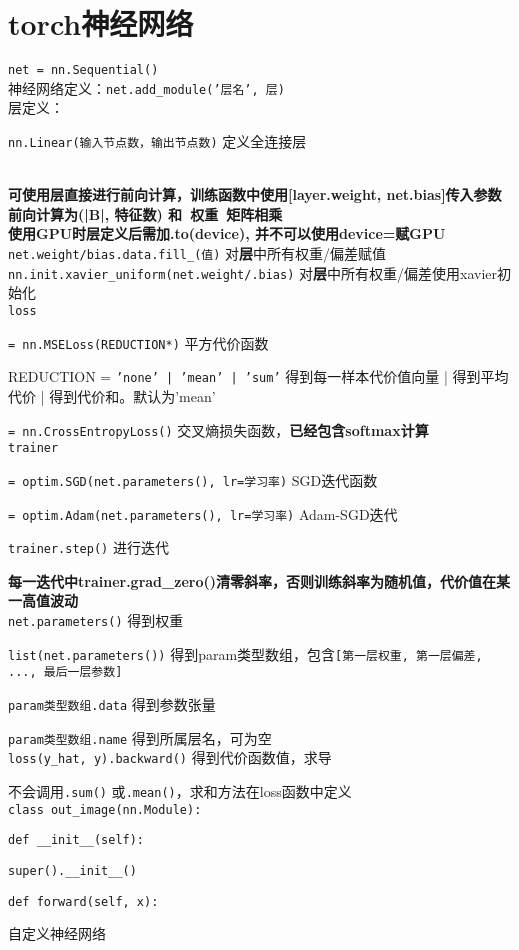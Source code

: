 \documentclass[UTF8]{ctexart}
\begin{document}
\section{torch神经网络}
\noindent \texttt{net = nn.Sequential()}\\
神经网络定义：\texttt{net.add\_module('层名', 层)}\\
层定义：

  \texttt{nn.Linear(输入节点数，输出节点数)} 定义全连接层

  \texttt{}\\
\textbf{可使用层直接进行前向计算，训练函数中使用[layer.weight, net.bias]传入参数}\\
\textbf{前向计算为(|B|, 特征数) 和\ 权重\ 矩阵相乘}\\
\textbf{使用GPU时层定义后需加.to(device), 并不可以使用device=赋GPU}\\
\texttt{net.weight/bias.data.fill\_(值)} 对\textbf{层}中所有权重/偏差赋值\\
\texttt{nn.init.xavier\_uniform(net.weight/.bias)} 对\textbf{层}中所有权重/偏差使用xavier初始化\\
\texttt{loss}

  \texttt{= nn.MSELoss(REDUCTION*)} 平方代价函数

  \quad REDUCTION = \texttt{'none' | 'mean' | 'sum'} 得到每一样本代价值向量 | 得到平均代价 | 得到代价和。默认为'mean'

  \texttt{= nn.CrossEntropyLoss()} 交叉熵损失函数，\textbf{已经包含softmax计算}\\
\texttt{trainer}

  \texttt{= optim.SGD(net.parameters(), lr=学习率)} SGD迭代函数

  \texttt{= optim.Adam(net.parameters(), lr=学习率)} Adam-SGD迭代

  \texttt{trainer.step()} 进行迭代
  
  \textbf{每一迭代中trainer.grad\_zero()清零斜率，否则训练斜率为随机值，代价值在某一高值波动}\\
\texttt{net.parameters()} 得到权重

  \texttt{list(net.parameters())} 得到param类型数组，包含\texttt{[第一层权重, 第一层偏差, ..., 最后一层参数]}
  
  \texttt{param类型数组.data} 得到参数张量
  
  \texttt{param类型数组.name} 得到所属层名，可为空\\
\texttt{loss(y\_hat, y).backward()} 得到代价函数值，求导

  不会调用\texttt{.sum()} 或\texttt{.mean()}，求和方法在loss函数中定义\\
\texttt{class out\_image(nn.Module):}

  \texttt{def \_\_init\_\_(self):}

  \quad \texttt{super().\_\_init\_\_()}

  \texttt{def forward(self, x):}

  \quad 自定义神经网络\\
\texttt{}

  



  

  
\end{document}
